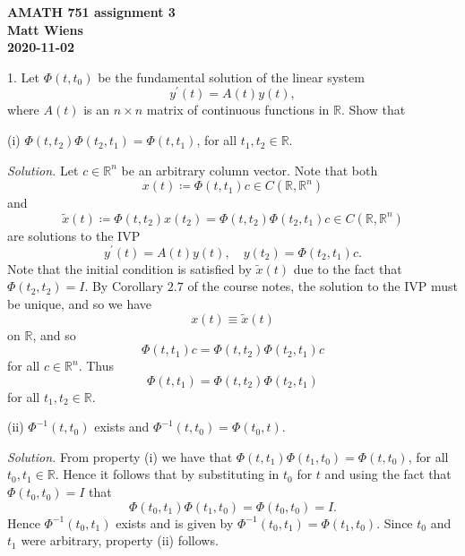 \documentclass{article}
\newcommand{\R}{\mathbb{R}}
\begin{document}
\textbf{AMATH 751 assignment 3} \\
\textbf{Matt Wiens} \\
\textbf{2020-11-02}

1. Let $\Phi(t, t_0)$ be the fundamental solution of the linear system
%
\begin{equation*}
    y^\prime(t) = A(t) y(t),
\end{equation*}
%
where $A(t)$ is an $n \times n$ matrix of continuous functions in $\R$. Show that

(i) $\Phi(t, t_2) \Phi(t_2, t_1) = \Phi(t, t_1)$, for all $t_1, t_2 \in \R$.

\textit{Solution.}
Let $c \in \R^n$ be an arbitrary column vector.
Note that both
%
\begin{equation*}
    x(t) \coloneqq \Phi(t, t_1) c \in C(\R, \R^n)
\end{equation*}
%
and
%
\begin{equation*}
    \tilde{x}(t) \coloneqq \Phi(t, t_2) x(t_2) = \Phi(t, t_2) \Phi(t_2, t_1) c \in C(\R, \R^n)
\end{equation*}
%
are solutions to the IVP
%
\begin{equation*}
    y^\prime(t) = A(t)y(t), \quad y(t_2) = \Phi(t_2, t_1) c
    .
\end{equation*}
%
Note that the initial condition is satisfied by $\tilde{x}(t)$
due to the fact that $\Phi(t_2, t_2) = I$.
By Corollary $2.7$ of the course notes, the solution to the
IVP must be unique, and so we have
%
\begin{equation*}
    x(t) \equiv \tilde{x}(t)
\end{equation*}
%
on $\R$, and so
%
\begin{equation*}
    \Phi(t, t_1) c = \Phi(t, t_2) \Phi(t_2, t_1) c
\end{equation*}
%
for all $c \in \R^n$. Thus
%
\begin{equation*}
    \Phi(t, t_1) = \Phi(t, t_2) \Phi(t_2, t_1)
\end{equation*}
%
for all $t_1, t_2 \in \R$.

\vspace{5mm}

(ii) $\Phi^{-1}(t, t_0)$ exists and $\Phi^{-1}(t, t_0) = \Phi(t_0, t)$.

\textit{Solution.}
From property (i) we have that
$\Phi(t, t_1) \Phi(t_1, t_0) = \Phi(t, t_0)$, for all $t_0, t_1 \in \R$.
Hence it follows that by substituting in $t_0$ for $t$ and using the fact that
$\Phi(t_0, t_0) = I$ that
%
\begin{equation*}
    \Phi(t_0, t_1) \Phi(t_1, t_0) = \Phi(t_0, t_0) = I
    .
\end{equation*}
%
Hence $\Phi^{-1}(t_0, t_1)$ exists and is given by $\Phi^{-1}(t_0, t_1) = \Phi(t_1, t_0)$.
Since $t_0$ and $t_1$ were arbitrary, property (ii) follows.
\end{document}
